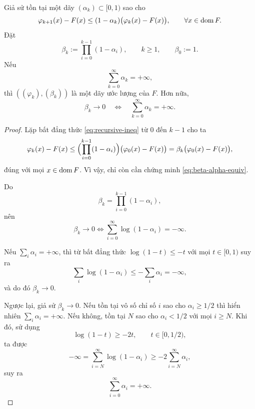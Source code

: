 \begin{proposition}
\label{prop:recursive}
Giả sử tồn tại một dãy $(\alpha_k)\subset[0,1)$ sao cho
\begin{equation}
\varphi_{k+1}(x)-F(x)
\le
(1-\alpha_k)\bigl(\varphi_k(x)-F(x)\bigr),
\qquad \forall x\in\operatorname{dom} F.
\label{eq:recursive-ineq}
\end{equation}
Đặt
\[
\beta_k:=\prod_{i=0}^{k-1}(1-\alpha_i),
\qquad k\ge1,\qquad
\beta_0:=1.
\]
Nếu
\[
\sum_{k=0}^{\infty}\alpha_k=+\infty,
\]
thì $((\varphi_k),(\beta_k))$ là một dãy ước lượng của $F$. Hơn nữa,
\begin{equation}
\beta_k\longrightarrow0
\quad\Longleftrightarrow\quad
\sum_{k=0}^{\infty}\alpha_k=+\infty.
\label{eq:beta-alpha-equiv}
\end{equation}
\end{proposition}
\begin{essayonly}
\begin{proof}
Lặp bất đẳng thức \eqref{eq:recursive-ineq} từ $0$ đến $k-1$ cho ta
\[
\varphi_k(x)-F(x)
\le
\Bigl(\prod_{i=0}^{k-1}(1-\alpha_i)\Bigr)
\bigl(\varphi_0(x)-F(x)\bigr)
=
\beta_k\bigl(\varphi_0(x)-F(x)\bigr),
\]
đúng với mọi $x\in\operatorname{dom} F$. Vì vậy, chỉ còn cần chứng minh
\eqref{eq:beta-alpha-equiv}.

Do
\[
\beta_k=\prod_{i=0}^{k-1}(1-\alpha_i),
\]
nên
\[
\beta_k\to0
\iff
\sum_{i=0}^{\infty}\log(1-\alpha_i)=-\infty.
\]

Nếu $\sum_i\alpha_i=+\infty$, thì từ bất đẳng thức
$\log(1-t)\le -t$ với mọi $t\in[0,1)$ suy ra
\[
\sum_i\log(1-\alpha_i)
\le
-\sum_i\alpha_i
=
-\infty,
\]
và do đó $\beta_k\to0$.

Ngược lại, giả sử $\beta_k\to0$. Nếu tồn tại vô số chỉ số $i$ sao cho
$\alpha_i\ge1/2$ thì hiển nhiên
$\sum_i\alpha_i=+\infty$. Nếu không, tồn tại $N$ sao cho
$\alpha_i<1/2$ với mọi $i\ge N$. Khi đó, sử dụng
\[
\log(1-t)\ge -2t,
\qquad t\in[0,1/2),
\]
ta được
\[
-\infty
=
\sum_{i=N}^{\infty}\log(1-\alpha_i)
\ge
-2\sum_{i=N}^{\infty}\alpha_i,
\]
suy ra
\[
\sum_{i=0}^{\infty}\alpha_i=+\infty.
\]
\end{proof}
\end{essayonly}
